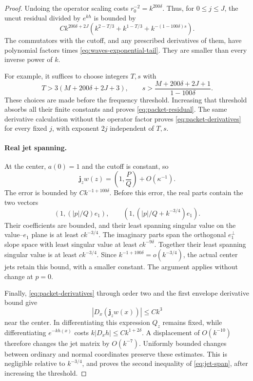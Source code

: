 \begin{proof}
Undoing the operator scaling costs \(r_0^{-2}=k^{200\delta}\).
Thus, for \(0\le j\le J\), the uncut residual divided by \(e^{kh}\)
is bounded by
\begin{equation}\label{eq:waves-accuracy-budget}
 C k^{200\delta+2J}
 \left(k^{2-T/3}+k^{1-T/3}
       +k^{-(1-100\delta)s}\right).
\end{equation}
The commutators with the cutoff, and any prescribed derivatives of
them, have polynomial factors times \eqref{eq:waves-exponential-tail}.
They are smaller than every inverse power of \(k\).

For example, it suffices to choose integers \(T,s\) with
\[
 T>3(M+200\delta+2J+3),\qquad
 s>\frac{M+200\delta+2J+1}{1-100\delta}.
\]
These choices are made before the frequency threshold.
Increasing that threshold absorbs all their finite constants and
proves \eqref{eq:packet-residual}. The same derivative calculation
without the operator factor proves \eqref{eq:packet-derivatives} for
every fixed \(j\), with exponent \(2j\) independent of \(T,s\).

\paragraph{Real jet spanning.}
At the center, \(a(0)=1\) and the cutoff is constant, so
\[
 \mathbf j_z w(z)=\left(1,\frac{P}{Q}\right)+O(\kappa^{-1}).
\]
The error is bounded by \(Ck^{-1+100\delta}\).
Before this error, the real parts contain the two vectors
\[
 (1,(|p|/Q)e_1),\qquad
 (1,(|p|/Q+k^{-3/4})e_1).
\]
Their coefficients are bounded, and their least spanning singular
value on the value--\(e_1\) plane is at least \(ck^{-3/4}\).
The imaginary parts span the orthogonal \(e_1^\perp\) slope space
with least singular value at least \(ck^{-9\delta}\).
Together their least spanning singular value is at least
\(ck^{-3/4}\). Since
\(k^{-1+100\delta}=o(k^{-3/4})\), the actual center jets retain this
bound, with a smaller constant. The argument applies without
change at \(p=0\).

Finally, \eqref{eq:packet-derivatives} through order two and the
first envelope derivative bound give
\[
 |D_x(\mathbf j_z w(x))|\le Ck^3
\]
near the center. In differentiating this expression \(Q_z\) remains
fixed, while differentiating \(e^{-kh(x)}\) costs
\(k|D_xh|\le Ck^{1+2\delta}\).
A displacement of \(O(k^{-10})\) therefore changes the jet matrix
by \(O(k^{-7})\). Uniformly bounded changes between ordinary and
normal coordinates preserve these estimates.
This is negligible relative to \(k^{-3/4}\), and proves the second
inequality of \eqref{eq:jet-span}, after increasing the threshold.
\end{proof}

